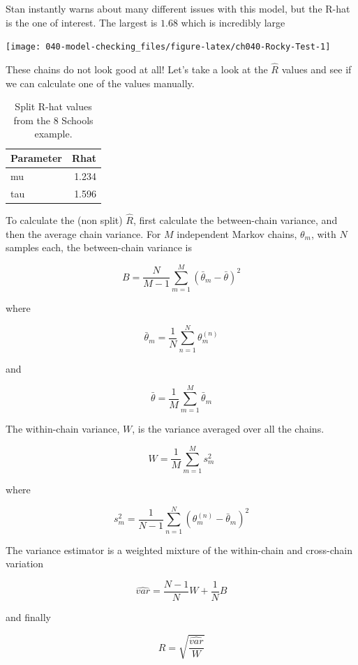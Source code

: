 \documentclass[11pt, oneside, openany]{scrbook}
\begin{document}
Stan instantly warns about many different issues with this model, but the R-hat is the one of interest. The largest is \(1.68\) which is incredibly large

\begin{center}\texttt{[image: 040-model-checking\_files/figure-latex/ch040-Rocky-Test-1]} \end{center}

These chains do not look good at all! Let's take a look at the \(\hat{R}\) values and see if we can calculate one of the values manually.

\begin{table}[!h]

\caption{\label{tab:unnamed-chunk-1}Split R-hat values from the 8 Schools example.}
\centering
\begin{tabular}[t]{lr}
\toprule
Parameter & Rhat\\
\midrule
mu & 1.234\\
tau & 1.596\\
\bottomrule
\end{tabular}
\end{table}

To calculate the (non split) \(\hat{R}\), first calculate the between-chain variance, and then the average chain variance. For \(M\) independent Markov chains, \(\theta_m\), with \(N\) samples each, the between-chain variance is

\[
B = \frac{N}{M-1}\sum_{m=1}^{M}\left(\bar{\theta}_m - \bar{\theta}\right)^2
\]

where

\[
\bar{\theta}_m = \frac{1}{N}\sum_{n=1}^{N}\theta_{m}^{(n)}
\]

and

\[
\bar{\theta} = \frac{1}{M}\sum_{m=1}^{M}\bar{\theta}_m
\]

The within-chain variance, \(W\), is the variance averaged over all the chains.

\[
W = \frac{1}{M}\sum_{m=1}^{M} s_{m}^2
\]

where

\[
s_{m}^2 = \frac{1}{N-1}\sum_{n=1}^{N}\left(\theta_{m}^{(n)} - \bar{\theta}_m\right)^2
\]

The variance estimator is a weighted mixture of the within-chain and cross-chain variation

\[
\hat{var} = \frac{N-1}{N} W + \frac{1}{N} B
\]

and finally

\[
\hat{R} = \sqrt{\frac{\hat{var}}{W}}
\]
\end{document}

